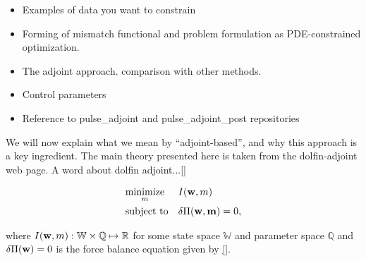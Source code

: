 \begin{itemize}
  \item Examples of data you want to constrain
  \item Forming of mismatch functional and problem formulation as
    PDE-constrained optimization.
  \item The adjoint approach. comparison with other methods.
  \item Control parameters
  \item Reference to pulse{\_}adjoint and pulse{\_}adjoint{\_}post
    repositories
\end{itemize}


We will now explain what we mean by ``adjoint-based'', and why this
approach is a key ingredient. The main theory presented here is taken
from the dolfin-adjoint web page. A word about dolfin adjoint...\ref{}
  
\begin{equation}
  \begin{aligned}
    \label{eq:opt_matparam}
    & \underset{m}{\text{minimize}}
    & &  I(\mathbf{w}, m) \\
    & \text{subject to}
    & & \delta \Pi(\mathbf{w}, \mathbf{m}) = 0, 
  \end{aligned}
\end{equation}

where $I(\mathbf{w}, m): \mathbb{W} \times \mathbb{Q} \mapsto
\mathbb{R}$ for some state space $\mathbb{W}$ and parameter space
$\mathbb{Q}$ and $\delta \Pi(\mathbf{w}) = 0$ is the force balance
equation given by \ref{}.


